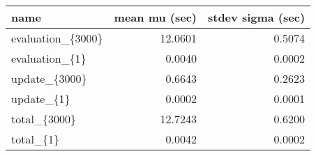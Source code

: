 \begin{tabular}{lrr}
\toprule
             name &  mean mu (sec) &  stdev sigma (sec) \\
\midrule
evaluation\_\{3000\} &        12.0601 &             0.5074 \\
   evaluation\_\{1\} &         0.0040 &             0.0002 \\
    update\_\{3000\} &         0.6643 &             0.2623 \\
       update\_\{1\} &         0.0002 &             0.0001 \\
     total\_\{3000\} &        12.7243 &             0.6200 \\
        total\_\{1\} &         0.0042 &             0.0002 \\
\bottomrule
\end{tabular}
